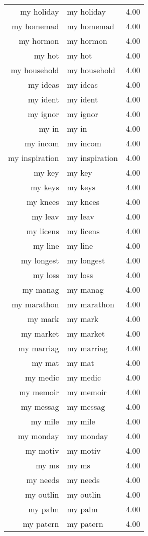 \begin{table}[ht]
\begin{tabular}{rlr}
  my holiday & my holiday & 4.00 \\ 
  my homemad & my homemad & 4.00 \\ 
  my hormon & my hormon & 4.00 \\ 
  my hot & my hot & 4.00 \\ 
  my household & my household & 4.00 \\ 
  my ideas & my ideas & 4.00 \\ 
  my ident & my ident & 4.00 \\ 
  my ignor & my ignor & 4.00 \\ 
  my in & my in & 4.00 \\ 
  my incom & my incom & 4.00 \\ 
  my inspiration & my inspiration & 4.00 \\ 
  my key & my key & 4.00 \\ 
  my keys & my keys & 4.00 \\ 
  my knees & my knees & 4.00 \\ 
  my leav & my leav & 4.00 \\ 
  my licens & my licens & 4.00 \\ 
  my line & my line & 4.00 \\ 
  my longest & my longest & 4.00 \\ 
  my loss & my loss & 4.00 \\ 
  my manag & my manag & 4.00 \\ 
  my marathon & my marathon & 4.00 \\ 
  my mark & my mark & 4.00 \\ 
  my market & my market & 4.00 \\ 
  my marriag & my marriag & 4.00 \\ 
  my mat & my mat & 4.00 \\ 
  my medic & my medic & 4.00 \\ 
  my memoir & my memoir & 4.00 \\ 
  my messag & my messag & 4.00 \\ 
  my mile & my mile & 4.00 \\ 
  my monday & my monday & 4.00 \\ 
  my motiv & my motiv & 4.00 \\ 
  my ms & my ms & 4.00 \\ 
  my needs & my needs & 4.00 \\ 
  my outlin & my outlin & 4.00 \\ 
  my palm & my palm & 4.00 \\ 
  my patern & my patern & 4.00 \\ 

\end{tabular}
\end{table}
